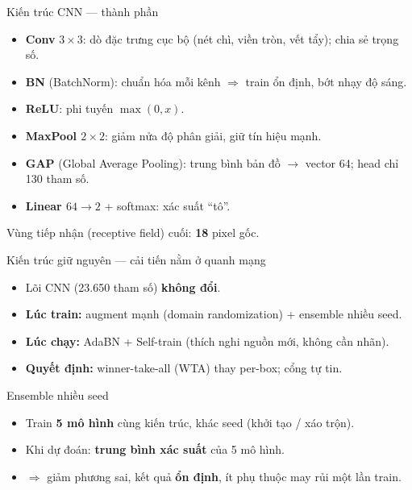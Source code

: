 \documentclass{beamer}
\newcommand{\hl}[1]{\textbf{#1}}
\begin{document}
\begin{frame}{Kiến trúc CNN --- thành phần}
\footnotesize
\begin{itemize}
    \item \hl{Conv} $3\times3$: dò đặc trưng cục bộ (nét chì, viền tròn, vết tẩy); chia sẻ trọng số.
    \item \hl{BN} (BatchNorm): chuẩn hóa mỗi kênh $\Rightarrow$ train ổn định, bớt nhạy độ sáng.
    \item \hl{ReLU}: phi tuyến $\max(0,x)$.
    \item \hl{MaxPool $2\times2$}: giảm nửa độ phân giải, giữ tín hiệu mạnh.
    \item \hl{GAP} (Global Average Pooling): trung bình bản đồ $\to$ vector 64; head chỉ 130 tham số.
    \item \hl{Linear $64\!\to\!2$} + softmax: xác suất ``tô''.
\end{itemize}
\vspace{0.2cm}
Vùng tiếp nhận (receptive field) cuối: \hl{18} pixel gốc.
\end{frame}

\begin{frame}{Kiến trúc giữ nguyên --- cải tiến nằm ở quanh mạng}
\vspace{0.25cm}
\begin{itemize}
    \item Lõi CNN (23.650 tham số) \hl{không đổi}.
    \item \hl{Lúc train:} augment mạnh (domain randomization) + ensemble nhiều seed.
    \item \hl{Lúc chạy:} AdaBN + Self-train (thích nghi nguồn mới, không cần nhãn).
    \item \hl{Quyết định:} winner-take-all (WTA) thay per-box; cổng tự tin.
\end{itemize}
\end{frame}

\begin{frame}{Ensemble nhiều seed}
\vspace{0.25cm}
\begin{itemize}
    \item Train \hl{5 mô hình} cùng kiến trúc, khác seed (khởi tạo / xáo trộn).
    \item Khi dự đoán: \hl{trung bình xác suất} của 5 mô hình.
    \item $\Rightarrow$ giảm phương sai, kết quả \hl{ổn định}, ít phụ thuộc may rủi một lần train.
\end{itemize}
\end{frame}
\end{document}
